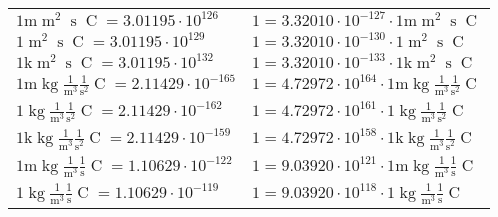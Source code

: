 \begin{center}
\begin{longtable}{l l}
{\color{gray}$1 \bm{\mathrm{ m}}{\operatorname{m}^2}{\operatorname{s}}{\operatorname{C}}{} = 3.01195\cdot10^{126} $}   & {\color{gray}$ 1 = 3.32010\cdot10^{-127} \cdot 1 \bm{\mathrm{ m}}{\operatorname{m}^2}{\operatorname{s}}{\operatorname{C}}{}$}  \\
{\color{black}$1 \bm{\mathrm{ }}{\operatorname{m}^2}{\operatorname{s}}{\operatorname{C}}{} = 3.01195\cdot10^{129} $}   & {\color{black}$ 1 = 3.32010\cdot10^{-130} \cdot 1 \bm{\mathrm{ }}{\operatorname{m}^2}{\operatorname{s}}{\operatorname{C}}{}$}  \\
{\color{gray}$1 \bm{\mathrm{ k}}{\operatorname{m}^2}{\operatorname{s}}{\operatorname{C}}{} = 3.01195\cdot10^{132} $}   & {\color{gray}$ 1 = 3.32010\cdot10^{-133} \cdot 1 \bm{\mathrm{ k}}{\operatorname{m}^2}{\operatorname{s}}{\operatorname{C}}{}$}  \\
\hline{\color{gray}$1 \bm{\mathrm{ m}}\operatorname{kg}\frac1{\operatorname{m}^3}\frac1{\operatorname{s}^2}{\operatorname{C}}{} = 2.11429\cdot10^{-165} $}   & {\color{gray}$ 1 = 4.72972\cdot10^{164} \cdot 1 \bm{\mathrm{ m}}\operatorname{kg}\frac1{\operatorname{m}^3}\frac1{\operatorname{s}^2}{\operatorname{C}}{}$}  \\
{\color{black}$1 \bm{\mathrm{ }}\operatorname{kg}\frac1{\operatorname{m}^3}\frac1{\operatorname{s}^2}{\operatorname{C}}{} = 2.11429\cdot10^{-162} $}   & {\color{black}$ 1 = 4.72972\cdot10^{161} \cdot 1 \bm{\mathrm{ }}\operatorname{kg}\frac1{\operatorname{m}^3}\frac1{\operatorname{s}^2}{\operatorname{C}}{}$}  \\
{\color{gray}$1 \bm{\mathrm{ k}}\operatorname{kg}\frac1{\operatorname{m}^3}\frac1{\operatorname{s}^2}{\operatorname{C}}{} = 2.11429\cdot10^{-159} $}   & {\color{gray}$ 1 = 4.72972\cdot10^{158} \cdot 1 \bm{\mathrm{ k}}\operatorname{kg}\frac1{\operatorname{m}^3}\frac1{\operatorname{s}^2}{\operatorname{C}}{}$}  \\
{\color{gray}$1 \bm{\mathrm{ m}}\operatorname{kg}\frac1{\operatorname{m}^3}\frac1{\operatorname{s}}{\operatorname{C}}{} = 1.10629\cdot10^{-122} $}   & {\color{gray}$ 1 = 9.03920\cdot10^{121} \cdot 1 \bm{\mathrm{ m}}\operatorname{kg}\frac1{\operatorname{m}^3}\frac1{\operatorname{s}}{\operatorname{C}}{}$}  \\
{\color{black}$1 \bm{\mathrm{ }}\operatorname{kg}\frac1{\operatorname{m}^3}\frac1{\operatorname{s}}{\operatorname{C}}{} = 1.10629\cdot10^{-119} $}   & {\color{black}$ 1 = 9.03920\cdot10^{118} \cdot 1 \bm{\mathrm{ }}\operatorname{kg}\frac1{\operatorname{m}^3}\frac1{\operatorname{s}}{\operatorname{C}}{}$}  \\

\end{longtable}
\end{center}
